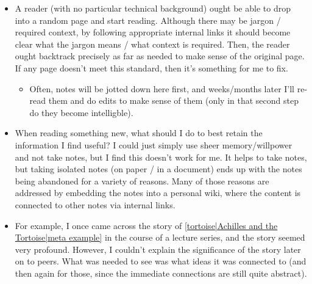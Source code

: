 \begin{itemize}
\item A reader (with no particular technical background) ought be able to drop into a random page and start reading. Although there may be jargon / required context, by following appropriate internal links it should become clear what the jargon means / what context is required. Then, the reader ought backtrack precisely as far as needed to make sense of the original page. If any page doesn't meet this standard, then it's something for me to fix. \begin{itemize}
\item Often, notes will be jotted down here first, and weeks/months later I'll re-read them and do edits to make sense of them (only in that second step do they become intelligble).
\end{itemize}
\item When reading something new, what should I do to best retain the information I find useful? I could just simply use sheer memory/willpower and not take notes, but I find this doesn't work for me. It helps to take notes, but taking isolated notes (on paper / in a document) ends up with the notes being abandoned for a variety of reasons. Many of those reasons are addressed by embedding the notes into a personal wiki, where the content is connected to other notes via internal links.
\item For example, I once came across the story of \ref{tortoise|Achilles and the Tortoise|meta example} in the course of a lecture series, and the story seemed very profound. However, I couldn't explain the significance of the story later on to peers. What was needed to see was what ideas it was connected to (and then again for those, since the immediate connections are still quite abstract).
\end{itemize}